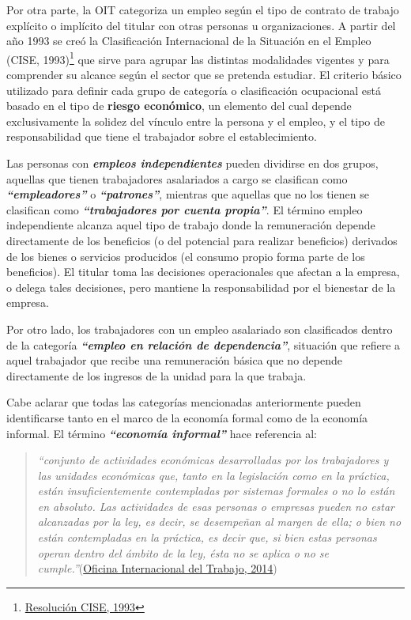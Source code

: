 \documentclass[
  openany]{book}
\begin{document}
Por otra parte, la OIT categoriza un empleo según el tipo de contrato de trabajo explícito o implícito del titular con otras personas u organizaciones. A partir del año 1993 se creó la Clasificación Internacional de la Situación en el Empleo (CISE, 1993)\footnote{\href{http://www.ilo.org/public/spanish/bureau/stat/download/res/icse.pdf}{Resolución CISE, 1993}} que sirve para agrupar las distintas modalidades vigentes y para comprender su alcance según el sector que se pretenda estudiar. El criterio básico utilizado para definir cada grupo de categoría o clasificación ocupacional está basado en el tipo de \textbf{riesgo económico}, un elemento del cual depende exclusivamente la solidez del vínculo entre la persona y el empleo, y el tipo de responsabilidad que tiene el trabajador sobre el establecimiento.

Las personas con \textbf{\emph{empleos independientes}} pueden dividirse en dos grupos, aquellas que tienen trabajadores asalariados a cargo se clasifican como \textbf{\emph{``empleadores''}} o \textbf{\emph{``patrones''}}, mientras que aquellas que no los tienen se clasifican como \textbf{\emph{``trabajadores por cuenta propia''}}. El término empleo independiente alcanza aquel tipo de trabajo donde la remuneración depende directamente de los beneficios (o del potencial para realizar beneficios) derivados de los bienes o servicios producidos (el consumo propio forma parte de los beneficios). El titular toma las decisiones operacionales que afectan a la empresa, o delega tales decisiones, pero mantiene la responsabilidad por el bienestar de la empresa.

Por otro lado, los trabajadores con un empleo asalariado son clasificados dentro de la categoría \textbf{\emph{``empleo en relación de dependencia''}}, situación que refiere a aquel trabajador que recibe una remuneración básica que no depende directamente de los ingresos de la unidad para la que trabaja.

Cabe aclarar que todas las categorías mencionadas anteriormente pueden identificarse tanto en el marco de la economía formal como de la economía informal. El término \textbf{\emph{``economía informal''}} hace referencia al:

\begin{quote}
\emph{``conjunto de actividades económicas desarrolladas por los trabajadores y las unidades económicas que, tanto en la legislación como en la práctica, están insuficientemente contempladas por sistemas formales o no lo están en absoluto. Las actividades de esas personas o empresas pueden no estar alcanzadas por la ley, es decir, se desempeñan al margen de ella; o bien no están contempladas en la práctica, es decir que, si bien estas personas operan dentro del ámbito de la ley, ésta no se aplica o no se cumple.''}(\protect\hyperlink{ref-oitconferencia14}{Oficina Internacional del Trabajo, 2014})
\end{quote}
\end{document}
